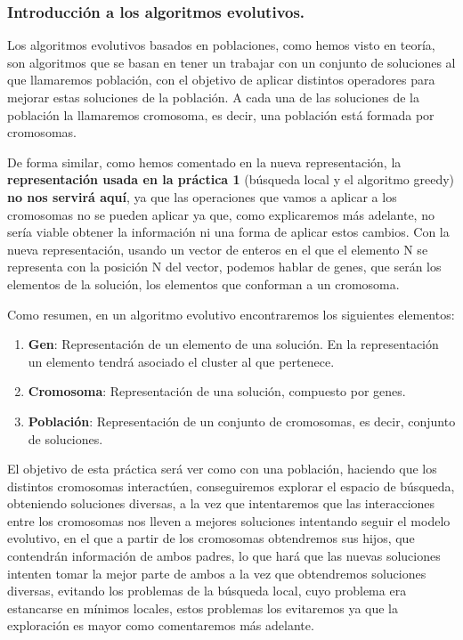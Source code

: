 \documentclass[12pt, spanish]{article}
\begin{document}
\subsubsection{Introducción a los algoritmos evolutivos.}

Los algoritmos evolutivos basados en poblaciones, como hemos visto en teoría, son algoritmos que se basan en tener un trabajar con un conjunto de soluciones al que llamaremos población, con el objetivo de aplicar distintos operadores para mejorar estas soluciones de la población. A cada una de las soluciones de la población la llamaremos cromosoma, es decir, una población está formada por cromosomas.

De forma similar, como hemos comentado en la nueva representación, la \textbf{representación usada en la práctica 1} (búsqueda local y el algoritmo greedy) \textbf{no nos servirá aquí}, ya que las operaciones que vamos a aplicar a los cromosomas no se pueden aplicar ya que, como explicaremos más adelante, no sería viable obtener la información ni una forma de aplicar estos cambios. Con la nueva representación, usando un vector de enteros en el que el elemento N se representa con la posición N del vector, podemos hablar de genes, que serán los elementos de la solución, los elementos que conforman a un cromosoma.

Como resumen, en un algoritmo evolutivo encontraremos los siguientes elementos:

\begin{enumerate}
	\item \textbf{Gen}: Representación de un elemento de una solución. En la representación un elemento tendrá asociado el cluster al que pertenece.
	\item \textbf{Cromosoma}: Representación de una solución, compuesto por genes.
	\item \textbf{Población}: Representación de un conjunto de cromosomas, es decir, conjunto de soluciones.
\end{enumerate}

El objetivo de esta práctica será ver como con una población, haciendo que los distintos cromosomas interactúen, conseguiremos explorar el espacio de búsqueda, obteniendo soluciones diversas, a la vez que intentaremos que las interacciones entre los cromosomas nos lleven a mejores soluciones intentando seguir el modelo evolutivo, en el que a partir de los cromosomas obtendremos sus hijos, que contendrán información de ambos padres, lo que hará que las nuevas soluciones intenten tomar la mejor parte de ambos a la vez que obtendremos soluciones diversas, evitando los problemas de la búsqueda local, cuyo problema era estancarse en mínimos locales, estos problemas los evitaremos ya que la exploración es mayor como comentaremos más adelante.
\end{document}
